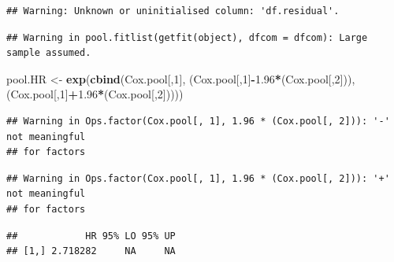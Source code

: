 \documentclass[
]{book}
\newenvironment{Shaded}{\begin{snugshade}}{\end{snugshade}}
\newcommand{\DataTypeTok}[1]{\textcolor[rgb]{0.13,0.29,0.53}{#1}}
\newcommand{\DecValTok}[1]{\textcolor[rgb]{0.00,0.00,0.81}{#1}}
\newcommand{\FloatTok}[1]{\textcolor[rgb]{0.00,0.00,0.81}{#1}}
\newcommand{\KeywordTok}[1]{\textcolor[rgb]{0.13,0.29,0.53}{\textbf{#1}}}
\newcommand{\NormalTok}[1]{#1}
\newcommand{\OperatorTok}[1]{\textcolor[rgb]{0.81,0.36,0.00}{\textbf{#1}}}
\newcommand{\StringTok}[1]{\textcolor[rgb]{0.31,0.60,0.02}{#1}}
\begin{document}
\begin{verbatim}
## Warning: Unknown or uninitialised column: 'df.residual'.
\end{verbatim}

\begin{verbatim}
## Warning in pool.fitlist(getfit(object), dfcom = dfcom): Large sample assumed.
\end{verbatim}

\begin{Shaded}
\begin{Highlighting}[]
\NormalTok{pool.HR <-}\StringTok{ }\KeywordTok{exp}\NormalTok{(}\KeywordTok{cbind}\NormalTok{(Cox.pool[,}\DecValTok{1}\NormalTok{], (Cox.pool[,}\DecValTok{1}\NormalTok{]}\OperatorTok{-}\FloatTok{1.96}\OperatorTok{*}\NormalTok{(Cox.pool[,}\DecValTok{2}\NormalTok{])), }
\NormalTok{           (Cox.pool[,}\DecValTok{1}\NormalTok{]}\OperatorTok{+}\FloatTok{1.96}\OperatorTok{*}\NormalTok{(Cox.pool[,}\DecValTok{2}\NormalTok{]))))}
\end{Highlighting}
\end{Shaded}

\begin{verbatim}
## Warning in Ops.factor(Cox.pool[, 1], 1.96 * (Cox.pool[, 2])): '-' not meaningful
## for factors
\end{verbatim}

\begin{verbatim}
## Warning in Ops.factor(Cox.pool[, 1], 1.96 * (Cox.pool[, 2])): '+' not meaningful
## for factors
\end{verbatim}

\begin{Shaded}
\end{Shaded}

\begin{verbatim}
##            HR 95% LO 95% UP
## [1,] 2.718282     NA     NA
\end{verbatim}

\begin{Shaded}
\end{Shaded}
\end{document}
